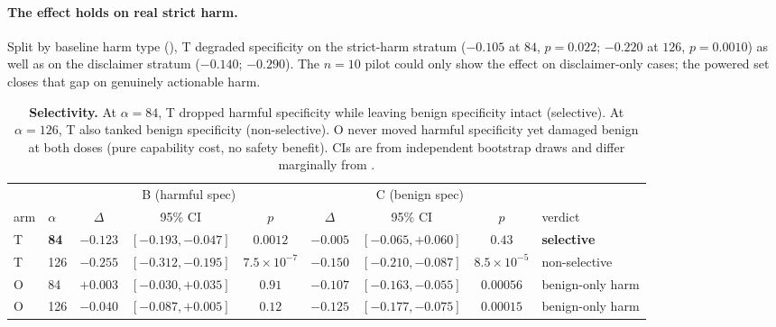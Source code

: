 \paragraph{The effect holds on real strict harm.} Split by baseline harm type
(), T degraded specificity on the strict-harm stratum
($-0.105$ at $84$, $p{=}0.022$; $-0.220$ at $126$, $p{=}0.0010$) as well as on the
disclaimer stratum ($-0.140$; $-0.290$). The $n{=}10$ pilot could only show the effect on
disclaimer-only cases; the powered set closes that gap on genuinely actionable harm.

\begin{table}[t]
\centering
\small
\begin{tabular}{ll ccc ccc l}
\toprule
& & \multicolumn{3}{c}{B (harmful spec)} & \multicolumn{3}{c}{C (benign spec)} & \\
\cmidrule(lr){3-5}\cmidrule(lr){6-8}
arm & $\alpha$ & $\Delta$ & 95\% CI & $p$ & $\Delta$ & 95\% CI & $p$ & verdict \\
\midrule
T & \textbf{84}  & $-0.123$ & $[-0.193,-0.047]$ & $0.0012$ & $-0.005$ & $[-0.065,+0.060]$ & $0.43$ & \textbf{selective} \\
T & 126 & $-0.255$ & $[-0.312,-0.195]$ & $7.5{\times}10^{-7}$ & $-0.150$ & $[-0.210,-0.087]$ & $8.5{\times}10^{-5}$ & non-selective \\
O & 84  & $+0.003$ & $[-0.030,+0.035]$ & $0.91$ & $-0.107$ & $[-0.163,-0.055]$ & $0.00056$ & benign-only harm \\
O & 126 & $-0.040$ & $[-0.087,+0.005]$ & $0.12$ & $-0.125$ & $[-0.177,-0.075]$ & $0.00015$ & benign-only harm \\
\bottomrule
\end{tabular}
\caption{\textbf{Selectivity.} At $\alpha{=}84$, T dropped harmful specificity while
leaving benign specificity intact (selective). At $\alpha{=}126$, T also tanked benign
specificity (non-selective). O never moved harmful specificity yet damaged benign at both
doses (pure capability cost, no safety benefit). CIs are from independent bootstrap draws
and differ marginally from .}
\label{tab:regionsteer-selectivity}
\end{table}

